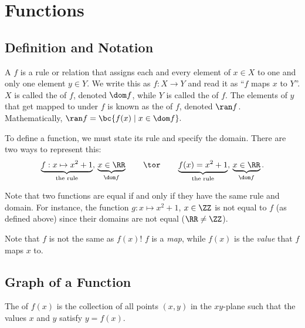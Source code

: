 \chapter{Functions}\label{chap:Functions}

\section{Definition and Notation}

\begin{definition}
    A  $f$ is a rule or relation that assigns each and every element of $x \in X$ to one and only one element $y \in Y$. We write this as $f : X \to Y$ and read it as ``$f$ maps $x$ to $Y$''. $X$ is called the  of $f$, denoted $\dom f$, while $Y$ is called the  of $f$. The elements of $y$ that get mapped to under $f$ is known as the  of $f$, denoted $\ran f$. Mathematically, $\ran f = \bc{f(x) \mid x \in \dom f}.$
\end{definition}

To define a function, we must state its rule and specify the domain. There are two ways to represent this: \[\underbrace{f : x \mapsto x^2 + 1}_{\text{the rule}}, \, \underbrace{x \in \RR}_{\dom f} \qquad \tor \qquad \underbrace{f(x) = x^2 + 1}_{\text{the rule}}, \, \underbrace{x \in \RR}_{\dom f}.\]

Note that two functions are equal if and only if they have the same rule and domain. For instance, the function $g : x \mapsto x^2 + 1$, $x \in \ZZ$ is not equal to $f$ (as defined above) since their domains are not equal ($\RR \neq \ZZ$).

Note that $f$ is not the same as $f(x)$! $f$ is a \textit{map}, while $f(x)$ is the \textit{value} that $f$ maps $x$ to.

\section{Graph of a Function}

\begin{definition}
    The  of $f(x)$ is the collection of all points $(x, y)$ in the $xy$-plane such that the values $x$ and $y$ satisfy $y = f(x)$.
\end{definition}

